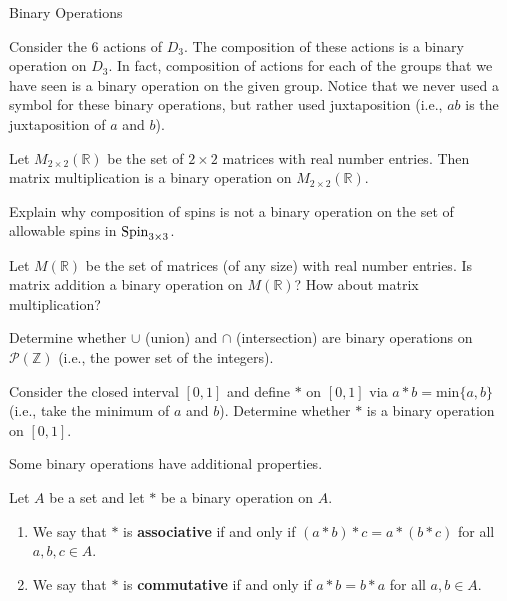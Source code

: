 \begin{section}{Binary Operations}
\begin{example}
Consider the 6 actions of \(D_3\).  The composition of these actions is a binary operation on \(D_3\).  In fact, composition of actions for each of the groups that we have seen is a binary operation on the given group.  Notice that we never used a symbol for these binary operations, but rather used juxtaposition (i.e., \(ab\) is the juxtaposition of \(a\) and \(b\)).
\end{example}

\begin{example}
Let \(M_{2\times 2}(\mathbb{R})\) be the set of \(2\times 2\) matrices with real number entries.  Then matrix multiplication is a binary operation on \(M_{2\times 2}(\mathbb{R})\).
\end{example}

\begin{exercise}
Explain why composition of spins is not a binary operation on the set of allowable spins in \(\operatorname{Spin}_{3\times 3}\).
\end{exercise}

\begin{exercise}
Let \(M(\mathbb{R})\) be the set of matrices (of any size) with real number entries.  Is matrix addition a binary operation on \(M(\mathbb{R})\)?  How about matrix multiplication?
\end{exercise}

\begin{exercise}
Determine whether \(\cup\) (union) and \(\cap\) (intersection) are binary operations on \(\mathcal{P}(\mathbb{Z})\) (i.e., the power set of the integers).
\end{exercise}

\begin{exercise}
Consider the closed interval \([0,1]\) and define \(*\) on \([0,1]\) via \(a*b=\mathrm{min}\{a,b\}\) (i.e., take the minimum of \(a\) and \(b\)).  Determine whether \(*\) is a binary operation on \([0,1]\).
\end{exercise}

Some binary operations have additional properties.

\begin{definition}
Let \(A\) be a set and let \(*\) be a binary operation on \(A\).
\begin{enumerate}
\item We say that \(*\) is \textbf{associative} if and only if \((a*b)*c=a*(b*c)\) for all \(a,b,c\in A\).
\item We say that \(*\) is \textbf{commutative} if and only if \(a*b=b*a\) for all \(a,b\in A\).
\end{enumerate}
\end{definition}


\end{section}
